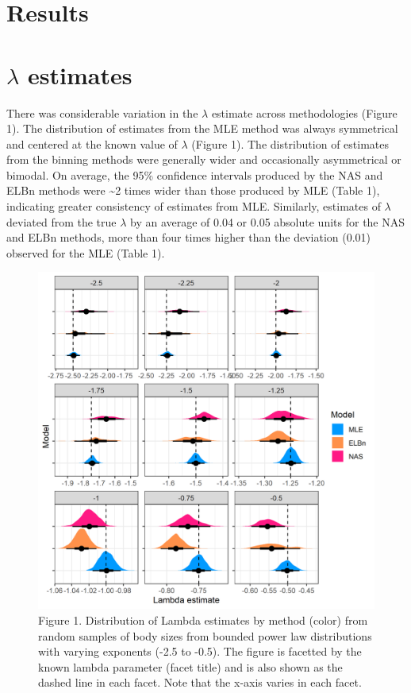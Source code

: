 \documentclass[
]{article}
\begin{document}
\hypertarget{results}{%
\section{Results}\label{results}}

\hypertarget{lambda-estimates}{%
\section{\texorpdfstring{\(\lambda\)
estimates}{\textbackslash lambda estimates}}\label{lambda-estimates}}

There was considerable variation in the \(\lambda\) estimate across
methodologies (Figure 1). The distribution of estimates from the MLE
method was always symmetrical and centered at the known value of
\(\lambda\) (Figure 1). The distribution of estimates from the binning
methods were generally wider and occasionally asymmetrical or bimodal.
On average, the 95\% confidence intervals produced by the NAS and ELBn
methods were \textasciitilde2 times wider than those produced by MLE
(Table 1), indicating greater consistency of estimates from MLE.
Similarly, estimates of \(\lambda\) deviated from the true \(\lambda\)
by an average of 0.04 or 0.05 absolute units for the NAS and ELBn
methods, more than four times higher than the deviation (0.01) observed
for the MLE (Table 1).

\begin{figure}
\centering
\includegraphics{figures/est_lambda_est_b_density.png}
\caption{Figure 1. Distribution of Lambda estimates by method (color)
from random samples of body sizes from bounded power law distributions
with varying exponents (-2.5 to -0.5). The figure is facetted by the
known lambda parameter (facet title) and is also shown as the dashed
line in each facet. Note that the x-axis varies in each facet.}
\end{figure}
\end{document}

